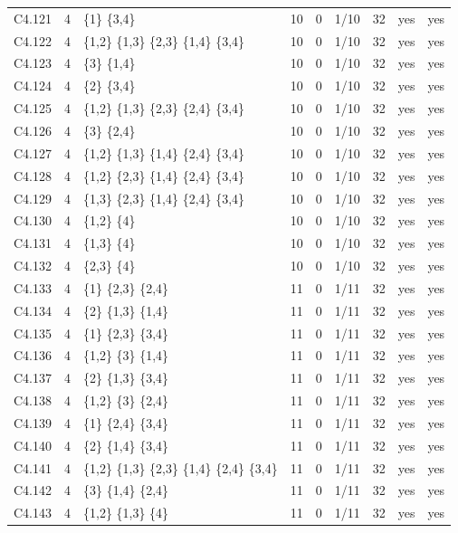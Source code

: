 {\begin{longtable}{@{}llp{6.2cm}rllrll@{}}
C4.121 & 4 & \{1\} \{3,4\} & 10 & 0 & 1/10 & 32 & yes & yes \\
C4.122 & 4 & \{1,2\} \{1,3\} \{2,3\} \{1,4\} \{3,4\} & 10 & 0 & 1/10 & 32 & yes & yes \\
C4.123 & 4 & \{3\} \{1,4\} & 10 & 0 & 1/10 & 32 & yes & yes \\
C4.124 & 4 & \{2\} \{3,4\} & 10 & 0 & 1/10 & 32 & yes & yes \\
C4.125 & 4 & \{1,2\} \{1,3\} \{2,3\} \{2,4\} \{3,4\} & 10 & 0 & 1/10 & 32 & yes & yes \\
C4.126 & 4 & \{3\} \{2,4\} & 10 & 0 & 1/10 & 32 & yes & yes \\
C4.127 & 4 & \{1,2\} \{1,3\} \{1,4\} \{2,4\} \{3,4\} & 10 & 0 & 1/10 & 32 & yes & yes \\
C4.128 & 4 & \{1,2\} \{2,3\} \{1,4\} \{2,4\} \{3,4\} & 10 & 0 & 1/10 & 32 & yes & yes \\
C4.129 & 4 & \{1,3\} \{2,3\} \{1,4\} \{2,4\} \{3,4\} & 10 & 0 & 1/10 & 32 & yes & yes \\
C4.130 & 4 & \{1,2\} \{4\} & 10 & 0 & 1/10 & 32 & yes & yes \\
C4.131 & 4 & \{1,3\} \{4\} & 10 & 0 & 1/10 & 32 & yes & yes \\
C4.132 & 4 & \{2,3\} \{4\} & 10 & 0 & 1/10 & 32 & yes & yes \\
C4.133 & 4 & \{1\} \{2,3\} \{2,4\} & 11 & 0 & 1/11 & 32 & yes & yes \\
C4.134 & 4 & \{2\} \{1,3\} \{1,4\} & 11 & 0 & 1/11 & 32 & yes & yes \\
C4.135 & 4 & \{1\} \{2,3\} \{3,4\} & 11 & 0 & 1/11 & 32 & yes & yes \\
C4.136 & 4 & \{1,2\} \{3\} \{1,4\} & 11 & 0 & 1/11 & 32 & yes & yes \\
C4.137 & 4 & \{2\} \{1,3\} \{3,4\} & 11 & 0 & 1/11 & 32 & yes & yes \\
C4.138 & 4 & \{1,2\} \{3\} \{2,4\} & 11 & 0 & 1/11 & 32 & yes & yes \\
C4.139 & 4 & \{1\} \{2,4\} \{3,4\} & 11 & 0 & 1/11 & 32 & yes & yes \\
C4.140 & 4 & \{2\} \{1,4\} \{3,4\} & 11 & 0 & 1/11 & 32 & yes & yes \\
C4.141 & 4 & \{1,2\} \{1,3\} \{2,3\} \{1,4\} \{2,4\} \{3,4\} & 11 & 0 & 1/11 & 32 & yes & yes \\
C4.142 & 4 & \{3\} \{1,4\} \{2,4\} & 11 & 0 & 1/11 & 32 & yes & yes \\
C4.143 & 4 & \{1,2\} \{1,3\} \{4\} & 11 & 0 & 1/11 & 32 & yes & yes \\

\end{longtable}}
